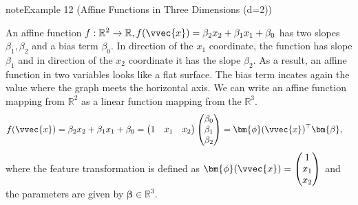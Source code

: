 \documentclass[letterpaper,10pt,english]{jupyterBook}
\begin{document}
\begin{sphinxadmonition}{note}{Example 12 (Affine Functions in Three Dimensions (d=2))}


\begin{center}\end{center}
\sphinxAtStartPar
An affine function \(f:\mathbb{R}^2\rightarrow\mathbb{R}, f(\vvec{x})= \beta_2x_2+\beta_1x_1+\beta_0\) has two slopes \(\beta_1,\beta_2\) and a bias term \(\beta_0\). In direction of the \(x_1\) coordinate, the function has slope \(\beta_1\) and in direction of the \(x_2\) coordinate it has the slope \(\beta_2\). As a result, an affine function in two variables looks like a flat surface. The bias term incates again the value where the graph meets the horizontal axis. We can write an affine function mapping from \(\mathbb{R}^2\) as a linear function mapping from the \(\mathbb{R}^3\).
\begin{align*}
    f(\vvec{x})&= \beta_2x_2+\beta_1x_1+\beta_0 
    =\begin{pmatrix}
    1& x_1&x_2\end{pmatrix}
    \begin{pmatrix}
    \beta_0 \\ \beta_1 \\ \beta_2\end{pmatrix}
    =\bm{\phi}(\vvec{x})^\top\bm{\beta},
\end{align*}
\sphinxAtStartPar
where the feature transformation is defined as
\(\bm{\phi}(\vvec{x})=\begin{pmatrix}1\\x_1\\x_2\end{pmatrix}\) and the parameters are given by \(\bm\beta\in\mathbb{R}^{3}\).
\end{sphinxadmonition}
\end{document}
